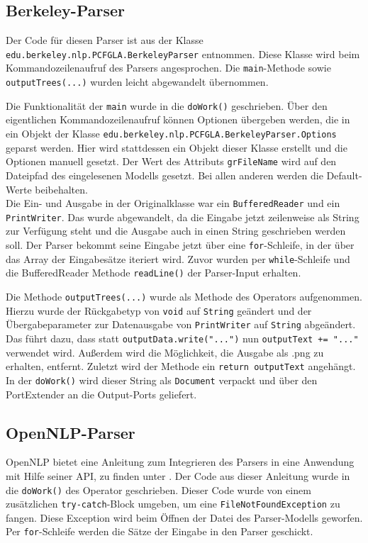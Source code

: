 \subsection{Berkeley-Parser}

Der Code für diesen Parser ist aus der Klasse \texttt{edu.berkeley.nlp.PCFGLA.BerkeleyParser} entnommen. Diese Klasse wird beim Kommandozeilenaufruf des Parsers angesprochen. Die \texttt{main}-Methode sowie \texttt{outputTrees(...)} wurden leicht abgewandelt übernommen. 

Die Funktionalität der \texttt{main} wurde in die \texttt{doWork()} geschrieben. Über den eigentlichen Kommandozeilenaufruf können Optionen übergeben werden, die in ein Objekt der Klasse \texttt{edu.berkeley.nlp.PCFGLA.BerkeleyParser.Options} geparst werden. Hier wird stattdessen ein Objekt dieser Klasse erstellt und die Optionen manuell gesetzt. Der Wert des Attributs \texttt{grFileName} wird auf den Dateipfad des eingelesenen Modells gesetzt. Bei allen anderen werden die Default-Werte beibehalten.\\ 
Die Ein- und Ausgabe in der Originalklasse war ein \texttt{BufferedReader} und ein \texttt{PrintWriter}. Das wurde abgewandelt, da die Eingabe jetzt zeilenweise als String zur Verfügung steht und die Ausgabe auch in einen String geschrieben werden soll. Der Parser bekommt seine Eingabe jetzt über eine \texttt{for}-Schleife, in der über das Array der Eingabesätze iteriert wird. Zuvor wurden per \texttt{while}-Schleife und die BufferedReader Methode \texttt{readLine()} der Parser-Input erhalten.

Die Methode \texttt{outputTrees(...)} wurde als Methode des Operators aufgenommen. Hierzu wurde der Rückgabetyp von \texttt{void} auf \texttt{String} geändert und der Übergabeparameter zur Datenausgabe von \texttt{PrintWriter} auf \texttt{String} abgeändert. Das führt dazu, dass statt \texttt{outputData.write("...")} nun \texttt{outputText += "..."} verwendet wird. Außerdem wird die Möglichkeit, die Ausgabe als .png zu erhalten, entfernt. Zuletzt wird der Methode ein \texttt{return outputText} angehängt. In der \texttt{doWork()} wird dieser String als \texttt{Document} verpackt und über den PortExtender an die Output-Ports geliefert.

\subsection{OpenNLP-Parser}
\label{sec:impl:eigene:opennlp}

OpenNLP bietet eine Anleitung zum Integrieren des Parsers in eine Anwendung mit Hilfe seiner API, zu finden unter \cite{openNlpManual}. 
Der Code aus dieser Anleitung wurde in die \texttt{doWork()} des Operator geschrieben. Dieser Code wurde von einem zusätzlichen \texttt{try-catch}-Block umgeben, um eine \texttt{FileNotFoundException} zu fangen. Diese Exception wird beim Öffnen der Datei des Parser-Modells geworfen. Per \texttt{for}-Schleife werden die Sätze der Eingabe in den Parser geschickt. 

